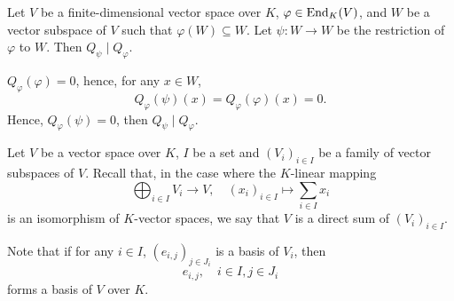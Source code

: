 \begin{propositionenv}\label{prop:6.3.2}
    Let $V$ be a finite-dimensional vector space over $K$,
    $\varphi \in \operatorname{\mathrm{End}}_{K}(V)$,
    and $W$ be a vector subspace of $V$ such that $\varphi(W) \subseteq W$.
    Let $\psi : W \rightarrow W$ be the restriction of $\varphi$ to $W$.
    Then $Q_{\psi} \mid Q_{\varphi}$.
\end{propositionenv}
\begin{proofenv}
    $Q_{\varphi}(\varphi) = 0$, hence, for any $x \in W$,
    $$Q_{\varphi}(\psi)(x) = Q_{\varphi}(\varphi)(x) = 0.$$
    Hence, $Q_{\varphi}(\psi) = 0$, then $Q_{\psi} \mid Q_{\varphi}$.
\end{proofenv}

\begin{definitionenv}\label{def:6.3.3}
    Let $V$ be a vector space over $K$,
    $I$ be a set and $(V_i)_{i \in I}$ be a family of vector subspaces of $V$.
    Recall that, in the case where the $K$-linear mapping
    $$ \bigoplus_{i \in I} V_i \longrightarrow V, \quad (x_i)_{i \in I} \longmapsto \sum_{i \in I} x_i$$
    is an isomorphism of $K$-vector spaces, we say that $V$ is a direct sum of $(V_i)_{i \in I}$.
    
    \quad Note that if for any $i \in I$, $(e_{i,j})_{j \in J_i}$ is a basis of $V_i$, then
    $$e_{i,j}, \quad i \in I, j \in J_i$$
    forms a basis of $V$ over $K$.
\end{definitionenv}

